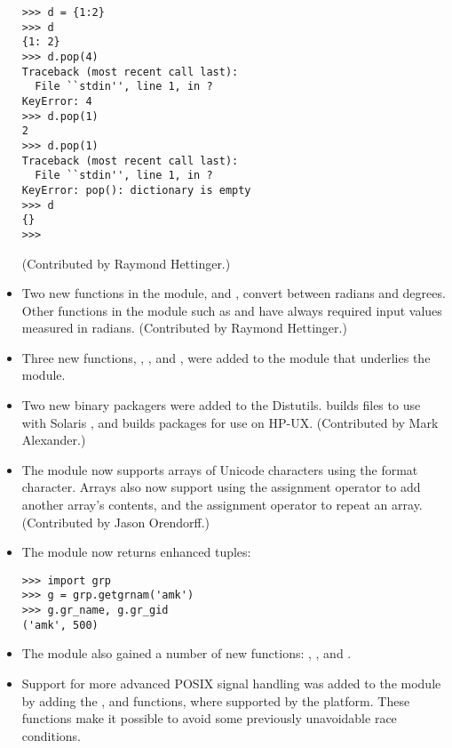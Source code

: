 \documentclass{howto}
\begin{document}
\begin{itemize}
\begin{verbatim}
>>> d = {1:2}
>>> d
{1: 2}
>>> d.pop(4)
Traceback (most recent call last):
  File ``stdin'', line 1, in ?
KeyError: 4
>>> d.pop(1)
2
>>> d.pop(1)
Traceback (most recent call last):
  File ``stdin'', line 1, in ?
KeyError: pop(): dictionary is empty
>>> d
{}
>>>
\end{verbatim}

(Contributed by Raymond Hettinger.)

\item Two new functions in the  module, 
 and ,
convert between radians and degrees.  Other functions in the 
 module such as
 and  have always required
input values measured in radians. (Contributed by Raymond Hettinger.)

\item Three new functions, , ,
and , were added to the  module that
underlies the  module.

\item Two new binary packagers were added to the Distutils.
 builds  files to use with Solaris
, and  builds 
packages for use on HP-UX.  (Contributed by Mark Alexander.)

\item The  module now supports arrays of Unicode
characters using the  format character.  Arrays also 
now support using the \code{+=} assignment operator to add another array's
contents, and the \code{*=} assignment operator to repeat an array.
(Contributed by Jason Orendorff.)

\item The  module now returns enhanced tuples:

\begin{verbatim}
>>> import grp
>>> g = grp.getgrnam('amk')
>>> g.gr_name, g.gr_gid
('amk', 500)
\end{verbatim}

\item The  module also gained a number of new
functions: ,
, and .

\item Support for more advanced POSIX signal handling was added
to the  module by adding the ,
 and  functions, where supported
by the platform.  These functions make it possible to avoid some previously
unavoidable race conditions.

\end{itemize}
\end{document}
